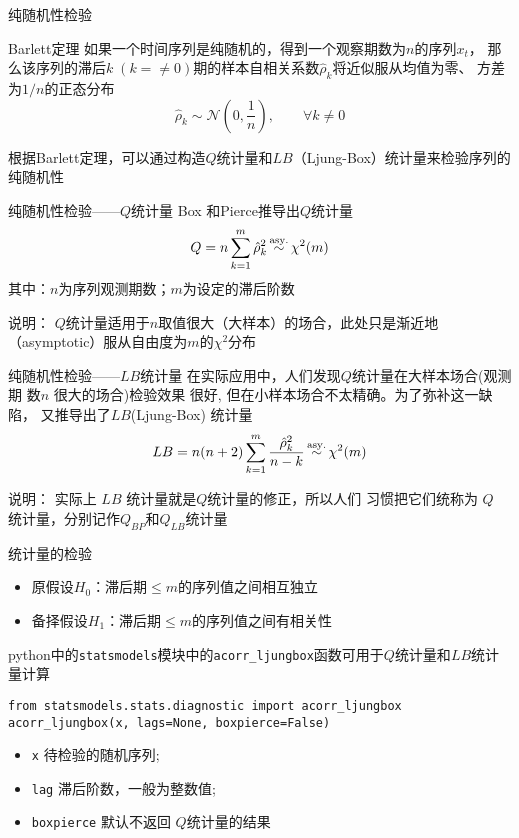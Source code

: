 \documentclass[t]{beamer}
\begin{document}
\begin{frame}[fragile]{纯随机性检验}
\begin{block}{Barlett定理}
如果一个时间序列是纯随机的，得到一个观察期数为$n$的序列$x_t$， 那么该序列的滞后$k\; (k=\ne 0)$期的样本自相关系数$\hat\rho_k$将近似服从均值为零、 方差为$1/n$的正态分布
\[\hat\rho_k \sim \mathcal{N}\left(0,\frac{1}{n}\right),\qquad \forall k\ne 0 \]
\end{block}

根据Barlett定理，可以通过构造$Q$统计量和$LB$（Ljung-Box）统计量来检验序列的纯随机性
\end{frame}


\begin{frame}[fragile]{纯随机性检验——$Q$统计量}
Box 和Pierce推导出$Q$统计量
\[Q=n\sum^m_{k=1}\hat \rho^2_k \mathop{\sim}^{\rm asy.}  \chi^2(m)\]
其中：$n$为序列观测期数；$m$为设定的滞后阶数

\begin{block}{说明：}
    $Q$统计量适用于$n$取值很大（大样本）的场合，此处只是渐近地（asymptotic）服从自由度为$m$的$\chi^2$分布
\end{block}
\end{frame}


\begin{frame}[fragile]{纯随机性检验——$LB$统计量}
在实际应用中，人们发现$Q$统计量在大样本场合(观测期 数$n$ 很大的场合)检验效果 很好, 但在小样本场合不太精确。为了弥补这一缺陷， 又推导出了$LB$(Ljung-Box)
统计量
\[LB=n(n+2) \sum^m_{k=1}\frac{\hat \rho^2_k }{n-k} \mathop{\sim}^{\rm asy.} \chi^2(m)\]
\begin{block}{说明：}
    实际上 $LB$ 统计量就是$Q$统计量的修正，所以人们 习惯把它们统称为 $Q$ 统计量，分别记作$Q_{BP}$和$Q_{LB}$统计量
\end{block}
\end{frame}


\begin{frame}[fragile]{统计量的检验}
\begin{itemize}
    \item 原假设$H_0$：滞后期$\le m$的序列值之间相互独立
    \item 备择假设$H_1$：滞后期$\le m$的序列值之间有相关性
\end{itemize}

python中的\verb|statsmodels|模块中的\verb|acorr_ljungbox|函数可用于$Q$统计量和$LB$统计量计算
\begin{lstlisting}
from statsmodels.stats.diagnostic import acorr_ljungbox
acorr_ljungbox(x, lags=None, boxpierce=False)
\end{lstlisting}
\begin{itemize}
    \item \verb|x| 待检验的随机序列;
    \item \verb|lag| 滞后阶数，一般为整数值;
    \item \verb|boxpierce| 默认不返回 $Q$统计量的结果
\end{itemize}

\end{frame}
\end{document}

